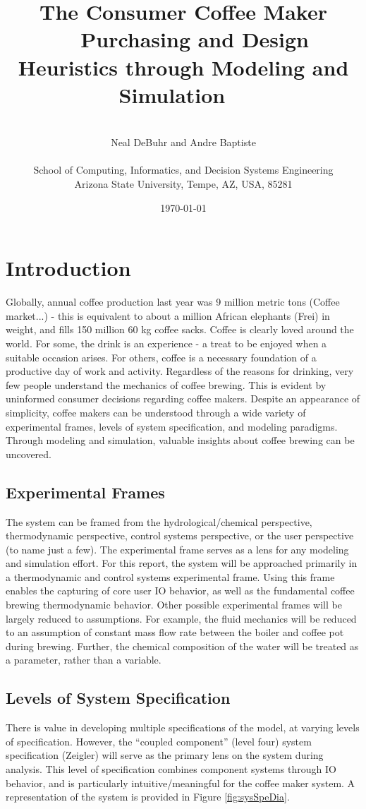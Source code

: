 \documentclass[10pt]{article}
\title{%
  The Consumer Coffee Maker \\
  {\large \subtitleaccent~~Purchasing and Design Heuristics through Modeling and Simulation~~\subtitleaccent}}
\author{%
  ~\\
  Neal DeBuhr and Andre Baptiste\\
  ~\\
  School of Computing, Informatics, and Decision Systems Engineering\\
  Arizona State University, Tempe, AZ, USA, 85281
}
\date{\today}
\begin{document}
\maketitle

\newpage
\tableofcontents
\newpage

\section{Introduction}
\label{sec:int}
Globally, annual coffee production last year was 9 million metric tons (Coffee market...) - this is equivalent to about a million African elephants (Frei) in weight, and fills 150 million 60 kg coffee sacks. Coffee is clearly loved around the world. For some, the drink is an experience - a treat to be enjoyed when a suitable occasion arises. For others, coffee is a necessary foundation of a productive day of work and activity. Regardless of the reasons for drinking, very few people understand the mechanics of coffee brewing. This is evident by uninformed consumer decisions regarding coffee makers. Despite an appearance of simplicity, coffee makers can be understood through a wide variety of experimental frames, levels of system specification, and modeling paradigms. Through modeling and simulation, valuable insights about coffee brewing can be uncovered.

\subsection{Experimental Frames}
The system can be framed from the hydrological/chemical perspective, thermodynamic perspective, control systems perspective, or the user perspective (to name just a few). The experimental frame serves as a lens for any modeling and simulation effort. For this report, the system will be approached primarily in a thermodynamic and control systems experimental frame. Using this frame enables the capturing of core user IO behavior, as well as the fundamental coffee brewing thermodynamic behavior. Other possible experimental frames will be largely reduced to assumptions. For example, the ﬂuid mechanics will be reduced to an assumption of constant mass ﬂow rate between the boiler and coffee pot during brewing. Further, the chemical composition of the water will be treated as a parameter, rather than a variable.

\subsection{Levels of System Specification}
There is value in developing multiple specifications of the model, at varying levels of specification.  However, the ``coupled component'' (level four) system specification (Zeigler) will serve as the primary lens on the system during analysis.  This level of specification combines component systems through IO behavior, and is particularly intuitive/meaningful for the coffee maker system.  A representation of the system is provided in Figure \ref{fig:sysSpeDia}.  %
\end{document}
